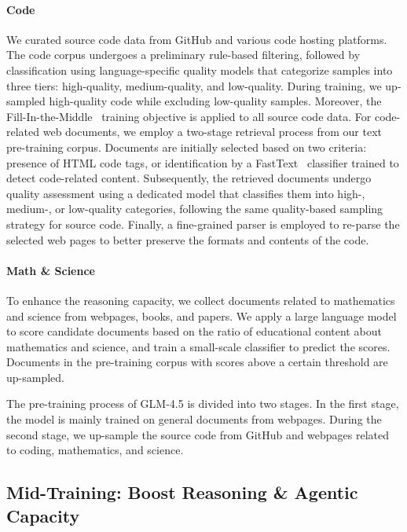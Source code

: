 \documentclass{article}
\theoremstyle{definition}
\begin{document}
\paragraph{Code} We curated source code data from GitHub and various code hosting platforms. The code corpus undergoes a preliminary rule-based filtering, followed by classification using language-specific quality models that categorize samples into three tiers: high-quality, medium-quality, and low-quality. During training, we up-sampled high-quality code while excluding low-quality samples. Moreover, the Fill-In-the-Middle~\cite{bavarian2022efficienttraininglanguagemodels} training objective is applied to all source code data. 
For code-related web documents, we employ a two-stage retrieval process from our text pre-training corpus. Documents are initially selected based on two criteria: presence of HTML code tags, or identification by a FastText~\citep{joulin2017bag} classifier trained to detect code-related content. Subsequently, the retrieved documents undergo quality assessment using a dedicated model that classifies them into high-, medium-, or low-quality categories, following the same quality-based sampling strategy for source code. Finally, a fine-grained parser is employed to re-parse the selected web pages to better preserve the formats and contents of the code.

\paragraph{Math \& Science} To enhance the reasoning capacity, we collect documents related to mathematics and science from webpages, books, and papers. We apply a large language model to score candidate documents based on the ratio of educational content about mathematics and science, and train a small-scale classifier to predict the scores. Documents in the pre-training corpus with scores above a certain threshold are up-sampled.

The pre-training process of GLM-4.5 is divided into two stages. In the first stage, the model is mainly trained on general documents from webpages. During the second stage, we up-sample the source code from GitHub and webpages related to coding, mathematics, and science.

\subsection{Mid-Training: Boost Reasoning \& Agentic Capacity}
\end{document}
